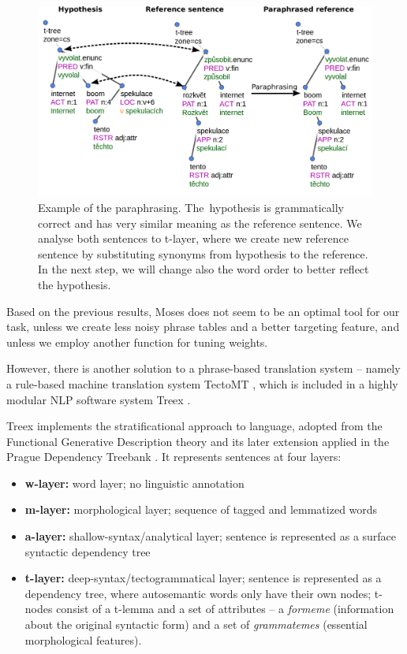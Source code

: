 \documentclass[11pt]{article}
\begin{document}
\begin{figure}[tb]
\begin{center}
\begin{tabular}{l|l}
\end{tabular}

\vspace{20pt}

\includegraphics[scale=0.4]{example.png} 

\caption{Example of the paraphrasing. The~hypothesis is grammatically correct 
and has very similar meaning as the reference sentence.  We analyse both 
sentences to t-layer, where we create new reference sentence by substituting
synonyms from hypothesis to the reference. In the next step, we will change also
the word order to better reflect the hypothesis.}
\label{treex_example}
\end{center}
\end{figure}

Based on the previous results, Moses does not seem to be an optimal tool for 
our task, unless we create less noisy phrase tables and a better targeting 
feature, and unless we employ another function for tuning weights. 

However, there is another solution to a phrase-based translation system -- 
namely a rule-based machine translation system TectoMT \cite{tectomt}, which is 
included in a highly modular NLP software system Treex \cite{treex}.

Treex implements the stratificational approach to language, adopted from the 
Functional Generative Description theory \cite{FGP} and its later extension 
applied in the Prague Dependency Treebank \cite{PDT3.0}. It represents 
sentences at four layers: 
\begin{itemize}
\item \textbf{w-layer:} word layer; no linguistic annotation
\item \textbf{m-layer:} morphological layer; sequence of tagged and lemmatized 
words
\item \textbf{a-layer:} shallow-syntax/analytical layer; sentence is 
represented as a surface syntactic dependency tree
\item \textbf{t-layer:} deep-syntax/tectogrammatical layer; sentence is 
represented as a dependency tree, where autosemantic words only have their own 
nodes; t-nodes consist of a t-lemma and a set of attributes -- a \textit{formeme} 
(information about the original syntactic form) and a set of \textit{grammatemes} 
(essential morphological features).
\end{itemize} 
\end{document}
